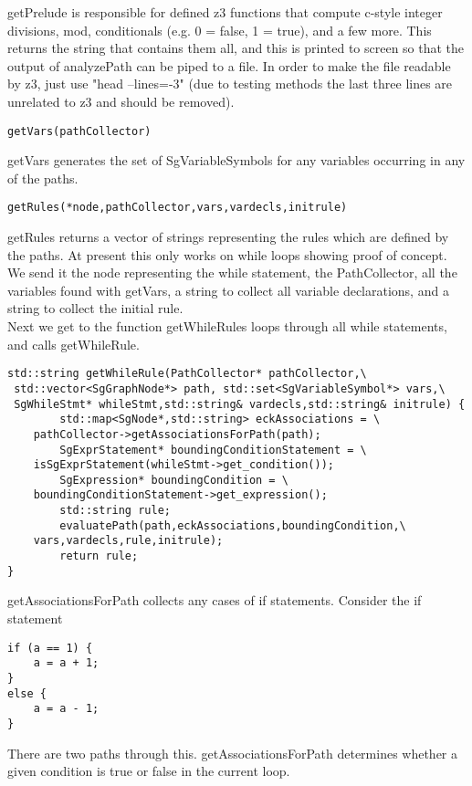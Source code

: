 \documentclass[11pt]{article}
\begin{document}
getPrelude is responsible for defined z3 functions that compute c-style integer divisions, mod, conditionals (e.g. 0 = false, 1 = true), and a few more. This returns the string that contains them all, and this is printed to screen so that the output of analyzePath can be piped to a file. In order to make the file readable by z3, just use "head --lines=-3" (due to testing methods the last three lines are unrelated to z3 and should be removed).\\
\begin{lstlisting}
getVars(pathCollector)
\end{lstlisting}
getVars generates the set of SgVariableSymbols for any variables occurring in any of the paths.\\
\begin{lstlisting}
getRules(*node,pathCollector,vars,vardecls,initrule)
\end{lstlisting}
getRules returns a vector of strings representing the rules which are defined by the paths. At present this only works on while loops showing proof of concept. We send it the node representing the while statement, the PathCollector, all the variables found with getVars, a string to collect all variable declarations, and a string to collect the initial rule.\\
Next we get to the function 
getWhileRules loops through all while statements, and calls getWhileRule.
\begin{lstlisting}
std::string getWhileRule(PathCollector* pathCollector,\
 std::vector<SgGraphNode*> path, std::set<SgVariableSymbol*> vars,\
 SgWhileStmt* whileStmt,std::string& vardecls,std::string& initrule) {
        std::map<SgNode*,std::string> eckAssociations = \
	pathCollector->getAssociationsForPath(path);
        SgExprStatement* boundingConditionStatement = \
	isSgExprStatement(whileStmt->get_condition());
        SgExpression* boundingCondition = \
	boundingConditionStatement->get_expression();
        std::string rule;
        evaluatePath(path,eckAssociations,boundingCondition,\
	vars,vardecls,rule,initrule);
        return rule;
}
\end{lstlisting}
getAssociationsForPath collects any cases of if statements. Consider the if statement
\begin{lstlisting}
if (a == 1) {
	a = a + 1;
}
else {
	a = a - 1;
}
\end{lstlisting}
There are two paths through this. getAssociationsForPath determines whether a given condition is true or false in the current loop.\\
\end{document}
